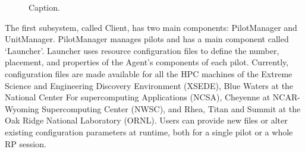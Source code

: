 \documentclass[preprint,12pt, a4paper]{elsarticle}
\begin{document}
\begin{figure}
    \centering
    \qquad
    \caption{Caption. }\label{fig:archs}
\end{figure}

The first subsystem, called Client, has two main components: PilotManager and
UnitManager. PilotManager manages pilots and has a main component called
`Launcher'. Launcher uses resource configuration files to define the number,
placement, and properties of the Agent's components of each pilot. Currently,
configuration files are made available for all the HPC machines of the
Extreme Science and Engineering Discovery Environment (XSEDE), Blue Waters at
the National Center For supercomputing Applications (NCSA), Cheyenne at
NCAR-Wyoming Supercomputing Center (NWSC), and Rhea, Titan and Summit at the
Oak Ridge National Laboratory (ORNL). Users can provide new files or alter
existing configuration parameters at runtime, both for a single pilot or a
whole RP session.
\end{document}
